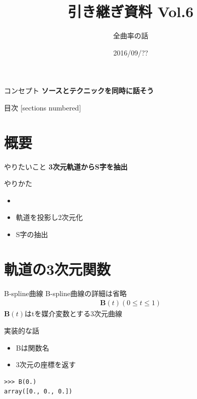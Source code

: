 \documentclass[12pt, xetex, xcolor=pdftex, dvipsnames]{beamer}
\title{引き継ぎ資料 Vol.6}
\subtitle{全曲率の話}
\date{2016/09/??}
\author{}
\institute{}
\renewcommand{\vec}{\textbf} %
\begin{document}
\maketitle
\begin{frame}{コンセプト}
    \alert{\textbf{ソースとテクニックを同時に話そう}}
\end{frame}

\begin{frame}{目次}
  [sections numbered]
  \tableofcontents[hideallsubsections]
\end{frame}

\section{概要}
\begin{frame}{やりたいこと}
\textbf{{\large 3次元軌道からS字を抽出}}
\end{frame}
\begin{frame}{やりかた}
    \begin{itemize}
        \item {}
        \item 軌道を投影し2次元化
        \item S字の抽出
    \end{itemize}
\end{frame}

\section{軌道の3次元関数}
\begin{frame}{B-spline曲線}
    B-spline曲線の詳細は省略
    \begin{align}
        \vec{B}(t) (0\leq t \leq 1)
    \end{align}
    $\vec{B}(t)$はtを媒介変数とする3次元曲線
\end{frame}
\begin{frame}[fragile]{実装的な話}
\begin{itemize}
\item Bは関数名
\item 3次元の座標を返す
\end{itemize}
\begin{lstlisting}
>>> B(0.)
array([0., 0., 0.])
\end{lstlisting}
\end{frame}
\end{document}
